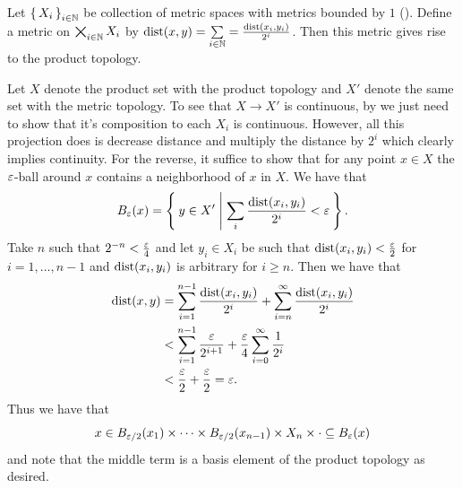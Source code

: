 \documentclass[letterpaper, 11pt]{article}
\begin{document}
\begin{prop}\label{prop: bounded_metrics_prod_top}
  Let $\set{X_{i}}_{i \in \mathbb{N}}$ be collection of metric spaces with metrics bounded by $1$ ().
  Define a metric on $\bigtimes_{i \in \mathbb{N}} X_{i}$ by $\operatorname{dist}(x, y) = \sum\limits_{i \in \mathbb{N}} = \frac{\operatorname{dist}(x_{i}, y_{i})}{2^{i}}$.
  Then this metric gives rise to the product topology.
\end{prop}
\begin{pf}
  Let $X$ denote the product set with the product topology and $X'$ denote the same set with the metric topology.
  To see that $X \to X'$ is continuous, by  we just need to show that it's composition to each $X_{i}$ is continuous.
  However, all this projection does is decrease distance and multiply the distance by $2^{i}$ which clearly implies continuity.
  For the reverse, it suffice to show that for any point $x \in X$ the $\varepsilon$-ball around $x$ contains a neighborhood of $x$ in $X$.
  We have that
  \[
    B_{\varepsilon}(x) = \Set{y \in X' | \sum_{i} \frac{\operatorname{dist}(x_{i}, y_{i})}{2^{i}} < \varepsilon}.
  \]
  Take $n$ such that $2^{-n} < \frac{\varepsilon}{4}$ and let $y_{i} \in X_{i}$ be such that $\operatorname{dist}(x_{i}, y_{i}) < \frac{\varepsilon}{2}$ for $i = 1, \ldots, n - 1$ and $\operatorname{dist}(x_{i}, y_{i})$ is arbitrary for $i \geq n$.
  Then we have that
  \begin{align*}
    \operatorname{dist}(x, y) &= \sum_{i = 1}^{n - 1} \frac{\operatorname{dist}(x_{i}, y_{i})}{2^{i}} + \sum_{i = n}^{\infty} \frac{\operatorname{dist}(x_{i}, y_{i})}{2^{i}} \\
                &< \sum_{i = 1}^{n - 1} \frac{\varepsilon}{2^{i + 1}} + \frac{\varepsilon}{4} \sum_{i = 0}^{\infty} \frac{1}{2^{i}} \\
                &< \frac{\varepsilon}{2} + \frac{\varepsilon}{2} = \varepsilon.
  \end{align*}
  Thus we have that
  \[
    x \in B_{\varepsilon/2}(x_{1}) \times \cdots \times B_{\varepsilon/2}(x_{n - 1}) \times X_{n} \times \cdot \subseteq B_{\varepsilon}(x)
  \]
  and note that the middle term is a basis element of the product topology as desired.
\end{pf}
\end{document}
